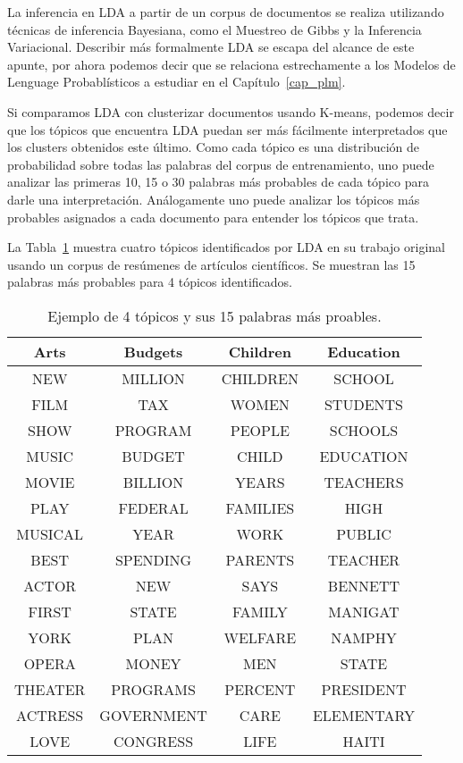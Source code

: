La inferencia en LDA a partir de un corpus de documentos se realiza utilizando técnicas de inferencia Bayesiana, como el Muestreo de Gibbs y la Inferencia Variacional. Describir más formalmente LDA se escapa del alcance de este apunte, por ahora podemos decir que se relaciona estrechamente a los Modelos de Lenguage Probablísticos a estudiar en el Capítulo~\ref{cap_plm}.

Si comparamos LDA con clusterizar documentos usando K-means, podemos decir que los tópicos que encuentra LDA puedan ser más fácilmente interpretados que los clusters obtenidos este último. Como cada tópico es una distribución de probabilidad sobre todas las palabras del corpus de entrenamiento, uno puede analizar las primeras 10, 15 o 30 palabras más probables de cada tópico para darle una interpretación. Análogamente uno puede analizar los tópicos más probables asignados a cada documento para entender los tópicos que trata. 

La Tabla~\ref{tab:lda} muestra cuatro tópicos identificados por LDA en su trabajo original \cite{blei2003latent} usando un corpus de resúmenes de artículos científicos. Se muestran las 15 palabras más probables para 4 tópicos identificados.

\begin{table}[h]
\centering
\begin{tabular}{|c|c|c|c|}
\hline
Arts & Budgets & Children & Education \\
\hline
NEW & MILLION & CHILDREN & SCHOOL \\
FILM & TAX & WOMEN & STUDENTS \\
SHOW & PROGRAM & PEOPLE & SCHOOLS \\
MUSIC & BUDGET & CHILD & EDUCATION \\
MOVIE & BILLION & YEARS & TEACHERS \\
PLAY & FEDERAL & FAMILIES & HIGH \\
MUSICAL & YEAR & WORK & PUBLIC \\
BEST & SPENDING & PARENTS & TEACHER \\
ACTOR & NEW & SAYS & BENNETT \\
FIRST & STATE & FAMILY & MANIGAT \\
YORK & PLAN & WELFARE & NAMPHY \\
OPERA & MONEY & MEN & STATE \\
THEATER & PROGRAMS & PERCENT & PRESIDENT \\
ACTRESS & GOVERNMENT & CARE & ELEMENTARY \\
LOVE & CONGRESS & LIFE & HAITI \\
\hline
\end{tabular}
\caption{Ejemplo de 4 tópicos y sus 15 palabras más proables.}
\label{tab:lda}
\end{table}

